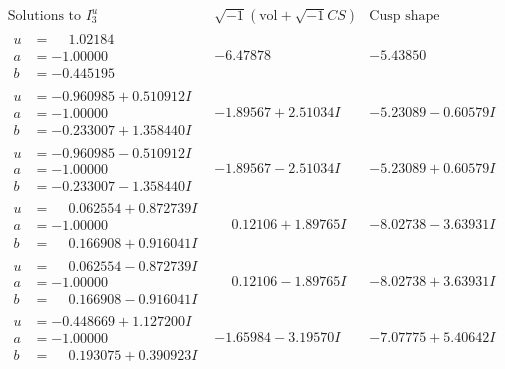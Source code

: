 \documentclass[1p]{elsarticle_modified}
\theoremstyle{definition}
\newcommand{\I}{\sqrt{-1}}
\begin{document}
$$\begin{array}{c|c|c}  
\text{Solutions to }I^u_{3}& \I (\text{vol} + \sqrt{-1}CS) & \text{Cusp shape}\\
 \hline 
\begin{aligned}
u &= \phantom{-}1.02184\phantom{ +0.000000I} \\
a &= -1.00000\phantom{ +0.000000I} \\
b &= -0.445195\phantom{ +0.000000I}\end{aligned}
 & -6.47878\phantom{ +0.000000I} & -5.43850\phantom{ +0.000000I} \\ \hline\begin{aligned}
u &= -0.960985 + 0.510912 I \\
a &= -1.00000\phantom{ +0.000000I} \\
b &= -0.233007 + 1.358440 I\end{aligned}
 & -1.89567 + 2.51034 I & -5.23089 - 0.60579 I \\ \hline\begin{aligned}
u &= -0.960985 - 0.510912 I \\
a &= -1.00000\phantom{ +0.000000I} \\
b &= -0.233007 - 1.358440 I\end{aligned}
 & -1.89567 - 2.51034 I & -5.23089 + 0.60579 I \\ \hline\begin{aligned}
u &= \phantom{-}0.062554 + 0.872739 I \\
a &= -1.00000\phantom{ +0.000000I} \\
b &= \phantom{-}0.166908 + 0.916041 I\end{aligned}
 & \phantom{-}0.12106 + 1.89765 I & -8.02738 - 3.63931 I \\ \hline\begin{aligned}
u &= \phantom{-}0.062554 - 0.872739 I \\
a &= -1.00000\phantom{ +0.000000I} \\
b &= \phantom{-}0.166908 - 0.916041 I\end{aligned}
 & \phantom{-}0.12106 - 1.89765 I & -8.02738 + 3.63931 I \\ \hline\begin{aligned}
u &= -0.448669 + 1.127200 I \\
a &= -1.00000\phantom{ +0.000000I} \\
b &= \phantom{-}0.193075 + 0.390923 I\end{aligned}
 & -1.65984 - 3.19570 I & -7.07775 + 5.40642 I \\ \hline\begin{aligned}

\end{aligned}
\end{array}$$
\end{document}
